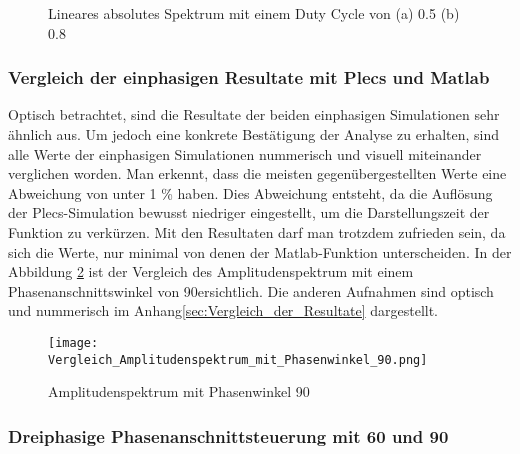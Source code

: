 \begin{figure}[ht!]
	\centering
	\qquad
	\caption{Lineares absolutes Spektrum mit einem Duty Cycle von (a) 0.5 (b) 0.8}
	\label{fig:plecs_Schwingungspakete_absolut log}
\end{figure}

\subsubsection{Vergleich der einphasigen Resultate mit Plecs und Matlab}

Optisch betrachtet, sind die Resultate der beiden einphasigen Simulationen sehr ähnlich aus. Um jedoch eine konkrete Bestätigung der Analyse zu erhalten, sind alle Werte der einphasigen Simulationen nummerisch und visuell miteinander verglichen worden. Man erkennt, dass die meisten gegenübergestellten Werte eine Abweichung von unter 1 \% haben. Dies Abweichung entsteht, da die Auflösung der Plecs-Simulation bewusst niedriger eingestellt, um die Darstellungszeit der Funktion zu verkürzen. Mit den Resultaten darf man trotzdem zufrieden sein, da sich die Werte, nur minimal von denen der Matlab-Funktion unterscheiden. In der Abbildung \ref{fig:Amplitudenspektrum mit Phasenwinkel 90grad} ist der Vergleich des Amplitudenspektrum mit einem Phasenanschnittswinkel von 90\textdegree ersichtlich. Die anderen Aufnahmen sind optisch und nummerisch im Anhang\ref{sec:Vergleich_der_Resultate} dargestellt.


\begin{figure}[ht!]
	\centering
	\texttt{[image: Vergleich\_Amplitudenspektrum\_mit\_Phasenwinkel\_90.png]}	
	\caption{Amplitudenspektrum mit Phasenwinkel 90\textdegree}
	\label{fig:Amplitudenspektrum mit Phasenwinkel 90grad}
\end{figure}


\subsubsection{Dreiphasige Phasenanschnittsteuerung mit 60\textdegree\hspace{0.02cm} und 90\textdegree\hspace{0.02cm}}


